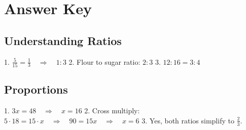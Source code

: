 \documentclass{article}
\begin{document}
\section*{Answer Key}
\subsection*{Understanding Ratios}
1. \(\frac{5}{15} = \frac{1}{3} \quad \Rightarrow \quad 1:3\)
2. Flour to sugar ratio: \(2:3\)
3. \(12:16 = 3:4\)

\subsection*{Proportions}
1. \(3x = 48 \quad \Rightarrow \quad x = 16\)
2. Cross multiply: \(5 \cdot 18 = 15 \cdot x \quad \Rightarrow \quad 90 = 15x \quad \Rightarrow \quad x = 6\)
3. Yes, both ratios simplify to \(\frac{2}{3}\).
\end{document}
